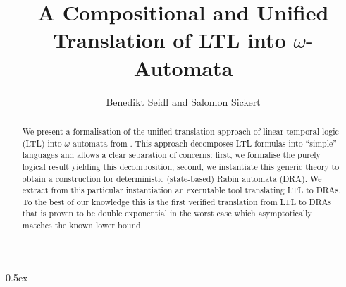 \documentclass[11pt,a4paper]{article}
\begin{document}
\title{A Compositional and Unified Translation of LTL into $\omega$-Automata}
\author{Benedikt Seidl and Salomon Sickert}
\maketitle

\begin{abstract}
We present a formalisation of the unified translation approach of linear temporal logic (LTL) into
$\omega$-automata from \cite{DBLP:conf/lics/EsparzaKS18}. This approach decomposes LTL formulas into
``simple'' languages and allows a clear separation of concerns: first, we formalise the purely
logical result yielding this decomposition; second, we instantiate this generic theory to obtain a
construction for deterministic (state-based) Rabin automata (DRA). We extract from this particular
instantiation an executable tool translating LTL to DRAs. To the best of our knowledge this is the
first verified translation from LTL to DRAs that is proven to be double exponential in the worst
case which asymptotically matches the known lower bound.
\end{abstract}

\tableofcontents

\parindent 0pt\parskip 0.5ex





\end{document}
